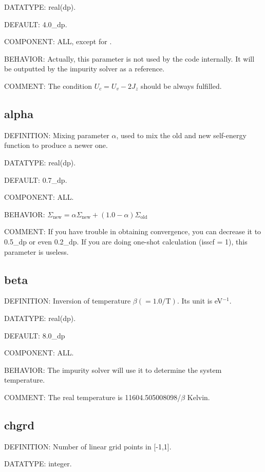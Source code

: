 {\color{green}DATATYPE:} real(dp).

{\color{blue}DEFAULT:} 4.0\_dp.

{\color{brown}COMPONENT:} ALL, except for {\daisy}.

{\color{purple}BEHAVIOR:} Actually, this parameter is not used by the code internally. It will be outputted by the impurity solver as a reference.

{\color{olive}COMMENT:} The condition $U_c = U_v - 2J_{z}$ should be always fulfilled.

\subsection{alpha}
{\color{red}DEFINITION:} Mixing parameter $\alpha$, used to mix the old and new self-energy function to produce a newer one.

{\color{green}DATATYPE:} real(dp).

{\color{blue}DEFAULT:} 0.7\_dp.

{\color{brown}COMPONENT:} ALL.

{\color{purple}BEHAVIOR:} $\Sigma_{\text{new}} = \alpha \Sigma_{\text{new}} + (1.0 - \alpha) \Sigma_{\text{old}}$

{\color{olive}COMMENT:} If you have trouble in obtaining convergence, you can decrease it to 0.5\_dp or even 0.2\_dp. If you are doing one-shot calculation (isscf = 1), this parameter is useless. 

\subsection{beta}
{\color{red}DEFINITION:} Inversion of temperature $\beta (= 1.0 / \text{T})$. Its unit is eV$^{-1}$.

{\color{green}DATATYPE:} real(dp).

{\color{blue}DEFAULT:} 8.0\_dp

{\color{brown}COMPONENT:} ALL.

{\color{purple}BEHAVIOR:} The impurity solver will use it to determine the system temperature.

{\color{olive}COMMENT:} The real temperature is 11604.505008098/$\beta$ Kelvin.

\subsection{chgrd}
{\color{red}DEFINITION:} Number of linear grid points in [-1,1].

{\color{green}DATATYPE:} integer.

